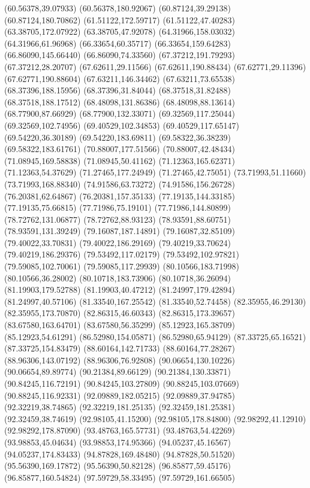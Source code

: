 {(60.56378,39.07933) (60.56378,180.92067) (60.87124,39.29138) (60.87124,180.70862) (61.51122,172.59717) (61.51122,47.40283) (63.38705,172.07922) (63.38705,47.92078)
(64.31966,158.03032) (64.31966,61.96968) (66.33654,60.35717) (66.33654,159.64283) (66.86090,145.66440) (66.86090,74.33560) (67.37212,191.79293) (67.37212,28.20707)
(67.62611,29.11566) (67.62611,190.88434) (67.62771,29.11396) (67.62771,190.88604) (67.63211,146.34462) (67.63211,73.65538) (68.37396,188.15956) (68.37396,31.84044)
(68.37518,31.82488) (68.37518,188.17512) (68.48098,131.86386) (68.48098,88.13614) (68.77900,87.66929) (68.77900,132.33071) (69.32569,117.25044) (69.32569,102.74956)
(69.40529,102.34853) (69.40529,117.65147) (69.54220,36.30189) (69.54220,183.69811) (69.58322,36.38239) (69.58322,183.61761) (70.88007,177.51566) (70.88007,42.48434)
(71.08945,169.58838) (71.08945,50.41162) (71.12363,165.62371) (71.12363,54.37629) (71.27465,177.24949) (71.27465,42.75051) (73.71993,51.11660) (73.71993,168.88340)
(74.91586,63.73272) (74.91586,156.26728) (76.20381,62.64867) (76.20381,157.35133) (77.19135,144.33185) (77.19135,75.66815) (77.71986,75.19101) (77.71986,144.80899)
(78.72762,131.06877) (78.72762,88.93123) (78.93591,88.60751) (78.93591,131.39249) (79.16087,187.14891) (79.16087,32.85109) (79.40022,33.70831) (79.40022,186.29169)
(79.40219,33.70624) (79.40219,186.29376) (79.53492,117.02179) (79.53492,102.97821) (79.59085,102.70061) (79.59085,117.29939) (80.10566,183.71998) (80.10566,36.28002)
(80.10718,183.73906) (80.10718,36.26094) (81.19903,179.52788) (81.19903,40.47212) (81.24997,179.42894) (81.24997,40.57106) (81.33540,167.25542) (81.33540,52.74458)
(82.35955,46.29130) (82.35955,173.70870) (82.86315,46.60343) (82.86315,173.39657) (83.67580,163.64701) (83.67580,56.35299) (85.12923,165.38709) (85.12923,54.61291)
(86.52980,154.05871) (86.52980,65.94129) (87.33725,65.16521) (87.33725,154.83479) (88.60164,142.71733) (88.60164,77.28267) (88.96306,143.07192) (88.96306,76.92808)
(90.06654,130.10226) (90.06654,89.89774) (90.21384,89.66129) (90.21384,130.33871) (90.84245,116.72191) (90.84245,103.27809) (90.88245,103.07669) (90.88245,116.92331)
(92.09889,182.05215) (92.09889,37.94785) (92.32219,38.74865) (92.32219,181.25135) (92.32459,181.25381) (92.32459,38.74619) (92.98105,41.15200) (92.98105,178.84800)
(92.98292,41.12910) (92.98292,178.87090) (93.48763,165.57731) (93.48763,54.42269) (93.98853,45.04634) (93.98853,174.95366) (94.05237,45.16567) (94.05237,174.83433)
(94.87828,169.48480) (94.87828,50.51520) (95.56390,169.17872) (95.56390,50.82128) (96.85877,59.45176) (96.85877,160.54824) (97.59729,58.33495) (97.59729,161.66505)
}
